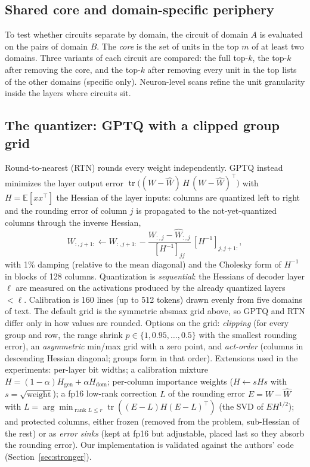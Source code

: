 \documentclass[11pt]{article}
\begin{document}
\subsection{Shared core and domain-specific periphery}
To test whether circuits separate by domain, the circuit of domain $A$ is evaluated on the pairs of domain $B$. The \emph{core} is the set of units in the top $m$ of at least two
domains. Three variants of each circuit are compared: the full top-$k$, the top-$k$ after removing the core, and the top-$k$ after removing every unit in the top lists of the other domains
(specific only). Neuron-level scans refine the unit granularity inside the layers where circuits sit.

\subsection{The quantizer: GPTQ with a clipped group grid}
\label{sec:gptq}
Round-to-nearest (RTN) rounds every weight independently. GPTQ instead minimizes the layer output error $\operatorname{tr}\bigl((W-\hat W)\,H\,(W-\hat W)^{\top}\bigr)$ with $H=\mathbb{E}[xx^{\top}]$ the Hessian of the layer inputs: columns are
quantized left to right and the rounding error of column $j$ is propagated to the not-yet-quantized columns through the inverse Hessian,
\begin{equation}
W_{:,j+1:}\leftarrow W_{:,j+1:}-\frac{W_{:,j}-\hat W_{:,j}}{[H^{-1}]_{jj}}\,[H^{-1}]_{j,j+1:},
\end{equation}
with 1\% damping (relative to the mean diagonal) and the Cholesky form of $H^{-1}$ in blocks of 128 columns. Quantization is \emph{sequential}: the Hessians of decoder layer $\ell$ are measured on the activations produced by the already quantized layers
$<\ell$. Calibration is 160 lines (up to 512 tokens) drawn evenly from five domains of text. The default grid is the symmetric absmax grid above, so GPTQ and RTN differ only in how values are rounded. Options on the grid:
\emph{clipping} (for every group and row, the range shrink $p\in\{1,0.95,\dots,0.5\}$ with the smallest rounding error), an \emph{asymmetric} min/max grid with a zero point, and \emph{act-order} (columns in descending Hessian diagonal; groups form in that order).
Extensions used in the experiments: per-layer bit widths; a calibration mixture $H=(1-\alpha)H_{\mathrm{gen}}+\alpha H_{\mathrm{dom}}$; per-column importance weights ($H\leftarrow sHs$ with $s=\sqrt{\text{weight}}$);
a fp16 low-rank correction $L$ of the rounding error $E=W-\hat W$ with $L=\arg\min_{\operatorname{rank}L\le r}\operatorname{tr}((E-L)H(E-L)^\top)$ (the SVD of $EH^{1/2}$); and protected columns, either frozen
(removed from the problem, sub-Hessian of the rest) or as \emph{error sinks} (kept at fp16 but adjustable, placed last so they absorb the rounding error). Our implementation is validated against the authors' code (Section~\ref{sec:stronger}).
\end{document}
